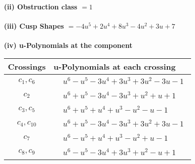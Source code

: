 \documentclass[1p]{elsarticle_modified}
\theoremstyle{definition}
\begin{document}
\flushleft \textbf{(ii) Obstruction class $= 1$}\\~\\
\flushleft \textbf{(iii) Cusp Shapes $= -4 u^5+2 u^4+8 u^3-4 u^2+3 u+7$}\\~\\
\newpage\renewcommand{\arraystretch}{1}
\flushleft \textbf{(iv) u-Polynomials at the component}\newline \\
\begin{tabular}{m{50pt}|m{274pt}}
Crossings & \hspace{64pt}u-Polynomials at each crossing \\
\hline $$\begin{aligned}c_{1},c_{6}\end{aligned}$$&$\begin{aligned}
&u^6- u^5-3 u^4+3 u^3+3 u^2-3 u-1
\end{aligned}$\\
\hline $$\begin{aligned}c_{2}\end{aligned}$$&$\begin{aligned}
&u^6+u^5-3 u^4-3 u^3+u^2+u+1
\end{aligned}$\\
\hline $$\begin{aligned}c_{3},c_{5}\end{aligned}$$&$\begin{aligned}
&u^6+u^5+u^4+u^3- u^2- u-1
\end{aligned}$\\
\hline $$\begin{aligned}c_{4},c_{10}\end{aligned}$$&$\begin{aligned}
&u^6+u^5-3 u^4-3 u^3+3 u^2+3 u-1
\end{aligned}$\\
\hline $$\begin{aligned}c_{7}\end{aligned}$$&$\begin{aligned}
&u^6- u^5+u^4+u^3- u^2+u-1
\end{aligned}$\\
\hline $$\begin{aligned}c_{8},c_{9}\end{aligned}$$&$\begin{aligned}
&u^6- u^5-3 u^4+3 u^3+u^2- u+1
\end{aligned}$\\
\hline
\end{tabular}\\~\\
\end{document}

